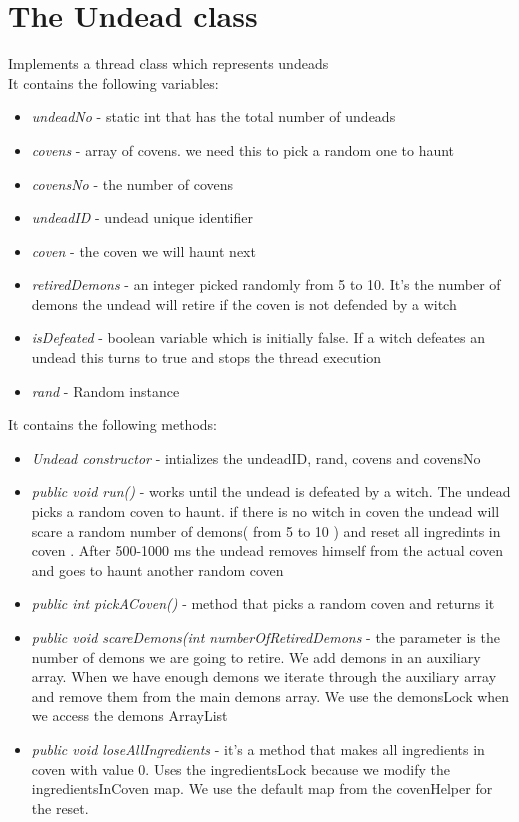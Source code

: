 \documentclass[14pt]{article}
\begin{document}
\section*{The Undead class}
\vspace{5 mm}
Implements a thread class which represents undeads\\
It contains the following variables:\\ 
\begin{itemize}
            \item \textit{undeadNo} - static int that has the total number of undeads
            \item \textit{covens} - array of covens. we need this to pick a random one to haunt
            \item \textit{covensNo} - the number of covens
            \item \textit{undeadID} - undead unique identifier
            \item \textit{coven} - the coven we will haunt next
            \item \textit{retiredDemons} - an integer picked randomly from 5 to 10. It's the number of demons the undead will retire if the coven is not defended by a witch
            \item \textit{isDefeated} - boolean variable which is initially false. If a witch defeates an undead this turns to true and stops the thread execution
            \item \textit{rand} - Random instance
            
\end{itemize}
It contains the following methods:\\
\begin{itemize}
            \item \textit{Undead constructor} - intializes the undeadID, rand, covens and covensNo
            \item \textit{public void run()} - works until the undead is defeated by a witch. The undead picks a random coven to haunt. if there is no witch in coven the undead will scare a random number of demons( from 5 to 10 ) and reset all ingredints in coven . After 500-1000 ms the undead removes himself from the actual coven and goes to haunt another random coven
            \item \textit{public int pickACoven()} - method that picks a random coven and returns it
            \item \textit{public void scareDemons(int numberOfRetiredDemons} - the parameter is the number of demons we are going to retire. We add demons in an auxiliary array. When we have enough demons we iterate through the auxiliary array and remove them from the main demons array. We use the demonsLock when we access the demons ArrayList
            
            \item \textit{public void loseAllIngredients} - it's a method that makes all ingredients in coven with value 0. Uses the ingredientsLock because we modify the ingredientsInCoven map. We use the default map from the covenHelper for the reset.
\end{itemize}
\end{document}
